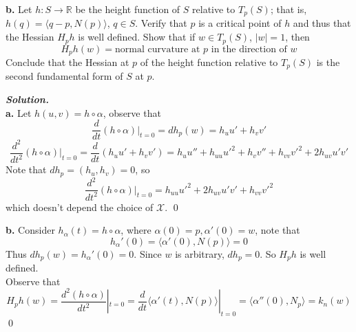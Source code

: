 \documentclass{article}
\begin{document}
\par
\textbf{b. }Let $h: S \to \mathbb{R}$ be the height function of $S$ relative to $T_p(S)$;
that is, $h(q) = \langle q-p, N(p)\rangle$, $q\in S$. Verify that $p$ is a critical point
of $h$ and thus that the Hessian $H_ph$ is well defined. Show that if $w \in T_p(S)$,
$|w|=1$, then
$$
    H_ph(w) = \text{normal curvature at $p$ in the direction of $w$}
$$
Conclude that the Hessian at $p$ of the height function relative to $T_p(S)$ is the 
second fundamental form of $S$ at $p$.

\par
\textbf{\textit{Solution.}}\\
\textbf{a. }Let $h(u,v) = h \circ \alpha$, observe that
$$
    \frac{d}{dt}(h \circ \alpha)|_{t=0} = dh_p(w) = h_u u' + h_v v'
$$
$$
    \frac{d^2}{dt^2}(h \circ \alpha)|_{t=0} = \frac{d}{dt}(h_u u' + h_v v')
    = h_u u'' + h_{uu} u'^2 + h_v v'' + h_{vv} v'^2 + 2h_{uv}u'v'
$$
Note that $dh_p = (h_u, h_v) = 0$, so
$$
    \frac{d^2}{dt^2}(h \circ \alpha)|_{t=0} = h_{uu} u'^2 + 2h_{uv}u'v' + h_{vv} v'^2
$$
which doesn't depend the choice of $\mathcal{X}$. \qed

\par
\textbf{b. }Consider $h_\alpha(t) = h \circ \alpha$, where $\alpha(0)=p, \alpha'(0)=w$,
note that
$$
    h_{\alpha}'(0) = \langle \alpha'(0), N(p) \rangle = 0
$$
Thus $dh_p(w) = h_{\alpha}'(0) = 0$. Since $w$ is arbitrary, $dh_p = 0$.
So $H_ph$ is well defined.\\
Observe that
$$
    H_ph(w) = \frac{d^2(h \circ \alpha)}{dt^2}|_{t=0}
    = \frac{d}{dt} \langle \alpha'(t), N(p)\rangle|_{t=0}
    = \langle \alpha''(0), N_p \rangle = k_n(w)
$$
\qed
\end{document}

